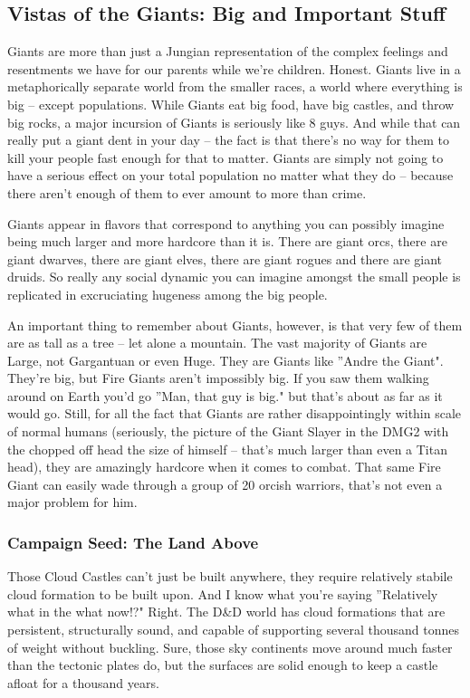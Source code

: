 \subsection{Vistas of the Giants: Big and Important Stuff}

Giants are more than just a Jungian representation of the complex feelings and resentments we have for our parents while we're children. Honest. Giants live in a metaphorically separate world from the smaller races, a world where everything is big -- except populations. While Giants eat big food, have big castles, and throw big rocks, a major incursion of Giants is seriously like 8 guys. And while that can really put a giant dent in your day -- the fact is that there's no way for them to kill your people fast enough for that to matter. Giants are simply not going to have a serious effect on your total population no matter what they do -- because there aren't enough of them to ever amount to more than crime.

Giants appear in flavors that correspond to anything you can possibly imagine being much larger and more hardcore than it is. There are giant orcs, there are giant dwarves, there are giant elves, there are giant rogues and there are giant druids. So really any social dynamic you can imagine amongst the small people is replicated in excruciating hugeness among the big people.

An important thing to remember about Giants, however, is that very few of them are as tall as a tree -- let alone a mountain. The vast majority of Giants are Large, not Gargantuan or even Huge. They are Giants like ''Andre the Giant". They're big, but Fire Giants aren't impossibly big. If you saw them walking around on Earth you'd go ''Man, that guy is big." but that's about as far as it would go. Still, for all the fact that Giants are rather disappointingly within scale of normal humans (seriously, the picture of the Giant Slayer in the DMG2 with the chopped off head the size of himself -- that's much larger than even a Titan head), they are amazingly hardcore when it comes to combat. That same Fire Giant can easily wade through a group of 20 orcish warriors, that's not even a major problem for him.

\subsubsection{Campaign Seed: The Land Above}
Those Cloud Castles can't just be built anywhere, they require relatively stabile cloud formation to be built upon. And I know what you're saying ''Relatively what in the what now!?" Right. The D\&D world has cloud formations that are persistent, structurally sound, and capable of supporting several thousand tonnes of weight without buckling. Sure, those sky continents move around much faster than the tectonic plates do, but the surfaces are solid enough to keep a castle afloat for a thousand years.

